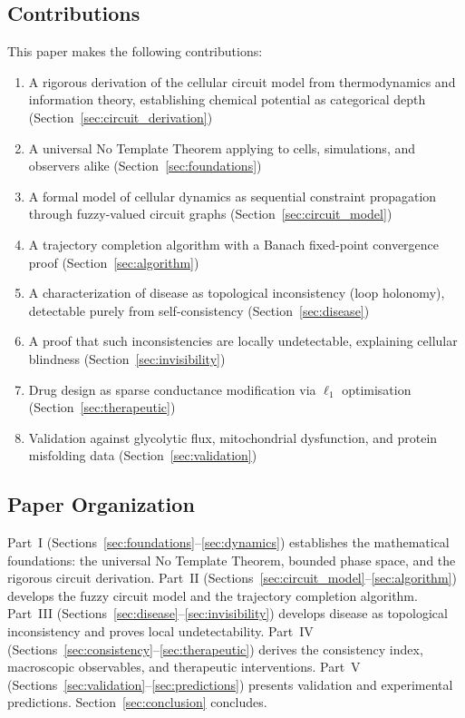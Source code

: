 \documentclass[10pt,twocolumn,a4paper]{article}
\theoremstyle{plain}
\theoremstyle{definition}
\theoremstyle{remark}
\begin{document}
\subsection{Contributions}

This paper makes the following contributions:
\begin{enumerate}[label=(\roman*), leftmargin=*]
    \item A rigorous derivation of the cellular circuit model from thermodynamics and information theory, establishing chemical potential as categorical depth (Section~\ref{sec:circuit_derivation})
    \item A universal No Template Theorem applying to cells, simulations, and observers alike (Section~\ref{sec:foundations})
    \item A formal model of cellular dynamics as sequential constraint propagation through fuzzy-valued circuit graphs (Section~\ref{sec:circuit_model})
    \item A trajectory completion algorithm with a Banach fixed-point convergence proof (Section~\ref{sec:algorithm})
    \item A characterization of disease as topological inconsistency (loop holonomy), detectable purely from self-consistency (Section~\ref{sec:disease})
    \item A proof that such inconsistencies are locally undetectable, explaining cellular blindness (Section~\ref{sec:invisibility})
    \item Drug design as sparse conductance modification via $\ell_1$ optimisation (Section~\ref{sec:therapeutic})
    \item Validation against glycolytic flux, mitochondrial dysfunction, and protein misfolding data (Section~\ref{sec:validation})
\end{enumerate}

\subsection{Paper Organization}

Part~I (Sections~\ref{sec:foundations}--\ref{sec:dynamics}) establishes the mathematical foundations: the universal No Template Theorem, bounded phase space, and the rigorous circuit derivation. Part~II (Sections~\ref{sec:circuit_model}--\ref{sec:algorithm}) develops the fuzzy circuit model and the trajectory completion algorithm. Part~III (Sections~\ref{sec:disease}--\ref{sec:invisibility}) develops disease as topological inconsistency and proves local undetectability. Part~IV (Sections~\ref{sec:consistency}--\ref{sec:therapeutic}) derives the consistency index, macroscopic observables, and therapeutic interventions. Part~V (Sections~\ref{sec:validation}--\ref{sec:predictions}) presents validation and experimental predictions. Section~\ref{sec:conclusion} concludes.
\end{document}
